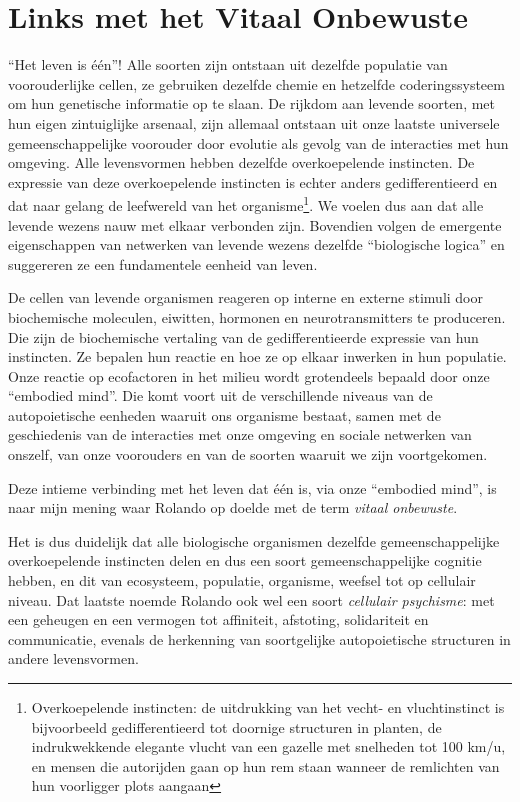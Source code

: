 \documentclass[
  11pt,
]{book}
\begin{document}
\hypertarget{links-met-het-vitaal-onbewuste}{%
\section{Links met het Vitaal Onbewuste}\label{links-met-het-vitaal-onbewuste}}

``Het leven is één''! Alle soorten zijn ontstaan uit dezelfde populatie van voorouderlijke cellen, ze gebruiken dezelfde chemie en hetzelfde coderingssysteem om hun genetische informatie op te slaan. De rijkdom aan levende soorten, met hun eigen zintuiglijke arsenaal, zijn allemaal ontstaan uit onze laatste universele gemeenschappelijke voorouder door evolutie als gevolg van de interacties met hun omgeving. Alle levensvormen hebben dezelfde overkoepelende instincten. De expressie van deze overkoepelende instincten is echter anders gedifferentieerd en dat naar gelang de leefwereld van het organisme\footnote{Overkoepelende instincten: de uitdrukking van het vecht- en vluchtinstinct is bijvoorbeeld gedifferentieerd tot doornige structuren in planten, de indrukwekkende elegante vlucht van een gazelle met snelheden tot 100 km/u, en mensen die autorijden gaan op hun rem staan wanneer de remlichten van hun voorligger plots aangaan}. We voelen dus aan dat alle levende wezens nauw met elkaar verbonden zijn. Bovendien volgen de emergente eigenschappen van netwerken van levende wezens dezelfde ``biologische logica'' en suggereren ze een fundamentele eenheid van leven.

De cellen van levende organismen reageren op interne en externe stimuli door biochemische moleculen, eiwitten, hormonen en neurotransmitters te produceren. Die zijn de biochemische vertaling van de gedifferentieerde expressie van hun instincten. Ze bepalen hun reactie en hoe ze op elkaar inwerken in hun populatie. Onze reactie op ecofactoren in het milieu wordt grotendeels bepaald door onze ``embodied mind''. Die komt voort uit de verschillende niveaus van de autopoietische eenheden waaruit ons organisme bestaat, samen met de geschiedenis van de interacties met onze omgeving en sociale netwerken van onszelf, van onze voorouders en van de soorten waaruit we zijn voortgekomen.

Deze intieme verbinding met het leven dat één is, via onze ``embodied mind'', is naar mijn mening waar Rolando op doelde met de term \emph{vitaal onbewuste}.

Het is dus duidelijk dat alle biologische organismen dezelfde gemeenschappelijke overkoepelende instincten delen en dus een soort gemeenschappelijke cognitie hebben, en dit van ecosysteem, populatie, organisme, weefsel tot op cellulair niveau. Dat laatste noemde Rolando ook wel een soort \emph{cellulair psychisme}: met een geheugen en een vermogen tot affiniteit, afstoting, solidariteit en communicatie, evenals de herkenning van soortgelijke autopoietische structuren in andere levensvormen.
\end{document}
